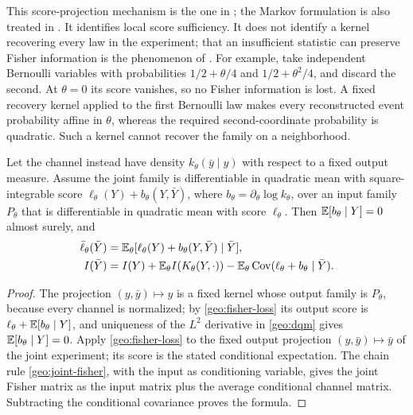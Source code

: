 This score-projection mechanism is the one in \citet[Theorem~7]{Pollard2013}; the Markov formulation is also treated in \citet{AyJostLeSchwachhofer2018}. It identifies local score sufficiency. It does not identify a kernel recovering every law in the experiment; that an insufficient statistic can preserve Fisher information is the phenomenon of \citet{KaganShepp2005}. For example, take independent Bernoulli variables with probabilities $1/2+\theta/4$ and $1/2+\theta^2/4$, and discard the second. At $\theta=0$ its score vanishes, so no Fisher information is lost. A fixed recovery kernel applied to the first Bernoulli law makes every reconstructed event probability affine in $\theta$, whereas the required second-coordinate probability is quadratic. Such a kernel cannot recover the family on a neighborhood.

Let the channel instead have density $k_\theta(\bar y\mid y)$ with respect to a fixed output measure. Assume the joint family is differentiable in quadratic mean with square-integrable score
$\ell_\theta(Y)+b_\theta(Y,\bar Y)$, where
$b_\theta=\partial_\theta\log k_\theta$, over an input family $P_\theta$ that is differentiable in quadratic mean with score $\ell_\theta$. Then $\mathbb E[b_\theta\mid Y]=0$ almost surely, and
\begin{align}
\bar\ell_\theta(\bar Y)
&=\mathbb E_\theta[\ell_\theta(Y)+b_\theta(Y,\bar Y)\mid\bar Y],\\
I(\bar Y)
&=I(Y)+\mathbb E_\theta I(K_\theta(Y,\cdot))
-\mathbb E_\theta\operatorname{Cov}(\ell_\theta+b_\theta\mid\bar Y).
\label{geo:moving-score}
\end{align}
\begin{proof}
The projection $(y,\bar y)\mapsto y$ is a fixed kernel whose output family is $P_\theta$, because every channel is normalized; by \cref{geo:fisher-loss} its output score is $\ell_\theta+\mathbb E[b_\theta\mid Y]$, and uniqueness of the $L^2$ derivative in \cref{geo:dqm} gives $\mathbb E[b_\theta\mid Y]=0$. Apply \cref{geo:fisher-loss} to the fixed output projection $(y,\bar y)\mapsto\bar y$ of the joint experiment; its score is the stated conditional expectation. The chain rule \cref{geo:joint-fisher}, with the input as conditioning variable, gives the joint Fisher matrix as the input matrix plus the average conditional channel matrix. Subtracting the conditional covariance proves the formula.
\end{proof}

